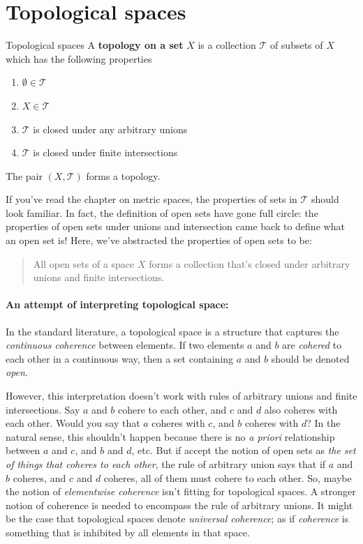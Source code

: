 \section{Topological spaces}

\begin{df}{Topological spaces}{}
  A \textbf{topology on a set} \(X\) is a collection \(\mathcal{T}\) of subsets of
  \(X\) which has the following properties
  \begin{enumerate}[noitemsep, label = T\arabic*)]
    \item \(\emptyset \in \mathcal{T}\)
    \item \(X \in \mathcal{T}\)
    \item \(\mathcal{T}\) is closed under any arbitrary unions
    \item \(\mathcal{T}\) is closed under finite intersections
  \end{enumerate}
  The pair \((X, \mathcal{T})\) forms a topology.
   
   
\end{df}
If you've read the chapter on metric spaces, the properties of sets in \(\mathcal{T}\)
should look familiar. In fact, the definition of open sets have gone full circle: the
properties of open sets under unions and intersection came back to define what an open
set is! Here, we've abstracted the properties of open sets to be:
\begin{quote}
  All open sets of a space \(X\) forms a collection that's closed under arbitrary unions
  and finite intersections.
\end{quote}

\paragraph{An attempt of interpreting topological space:}

In the standard literature, a topological space is a structure that captures the \emph{continuous
coherence} between elements. If two elements \(a\) and \(b\) are \emph{cohered} to each
other in a continuous way, then a set containing \(a\) and \(b\) should be denoted \emph{open}.

However, this interpretation doesn't work with rules of arbitrary unions and finite intersections.
Say \(a\) and \(b\) cohere to each other, and \(c\) and \(d\) also coheres with each other. Would
you say that \(a\) coheres with \(c\), and \(b\) coheres with \(d\)? In the natural sense, this
shouldn't happen because there is no \emph{a priori} relationship between \(a\) and \(c\), and \(b\)
and \(d\), etc. But if accept the notion of open sets as \emph{the set of things that coheres to
each other}, the rule of arbitrary union says that if \(a\) and \(b\) coheres, and \(c\) and \(d\)
coheres, all of them must cohere to each other. So, maybe the notion of \emph{elementwise coherence}
isn't fitting for topological spaces. A stronger notion of coherence is needed to encompass
the rule of arbitrary unions. It might be the case that topological spaces denote \emph{universal
coherence}; as if \emph{coherence} is something that is inhibited by all elements in that space.

